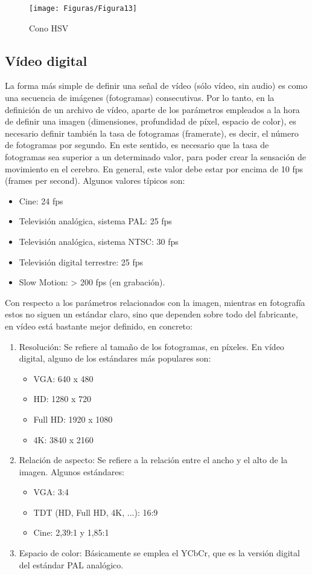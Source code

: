 \documentclass[es,practica]{uah}
\begin{document}
\begin{figure}[h!]
  \centering
  \texttt{[image: Figuras/Figura13]}
  \caption{Cono HSV}
  \label{fig:fig13}
\end{figure}

\subsection{Vídeo digital}

La forma más simple de definir una señal de vídeo (sólo vídeo, sin audio) es como una secuencia de imágenes (fotogramas) consecutivas. Por lo tanto, en la definición de un archivo de vídeo, aparte de los parámetros empleados a la hora de definir una imagen (dimensiones, profundidad de píxel, espacio de color), es necesario definir también la tasa de fotogramas (framerate), es decir, el número de fotogramas por segundo. En este sentido, es necesario que la tasa de fotogramas sea superior a un determinado valor, para poder crear la sensación de movimiento en el cerebro. En general, este valor debe estar por encima de 10 fps (frames per second). Algunos valores típicos son:
\begin{itemize}
	\item Cine: 24 fps
	\item Televisión analógica, sistema PAL: 25 fps
	\item Televisión analógica, sistema NTSC: 30 fps
	\item Televisión digital terrestre: 25 fps
	\item Slow Motion: > 200 fps (en grabación).
\end{itemize}

Con respecto a los parámetros relacionados con la imagen, mientras en fotografía estos no siguen un estándar claro, sino que dependen sobre todo del fabricante, en vídeo está bastante mejor definido, en concreto:
\begin{enumerate}
	\item Resolución: Se refiere al tamaño de los fotogramas, en píxeles. En vídeo digital, alguno de los estándares más populares son:
	\begin{itemize}
		\item VGA: 640 x 480
		\item HD: 1280 x 720
		\item Full HD: 1920 x 1080
		\item 4K: 3840 x 2160
	\end{itemize}
	\item Relación de aspecto: Se refiere a la relación entre el ancho y el alto de la imagen. Algunos estándares:
	\begin{itemize}
		\item VGA: 3:4
		\item TDT (HD, Full HD, 4K, ...): 16:9
		\item Cine: 2,39:1 y 1,85:1
	\end{itemize}
	\item Espacio de color: Básicamente se emplea el YCbCr, que es la versión digital del estándar PAL analógico.
\end{enumerate}
\end{document}

